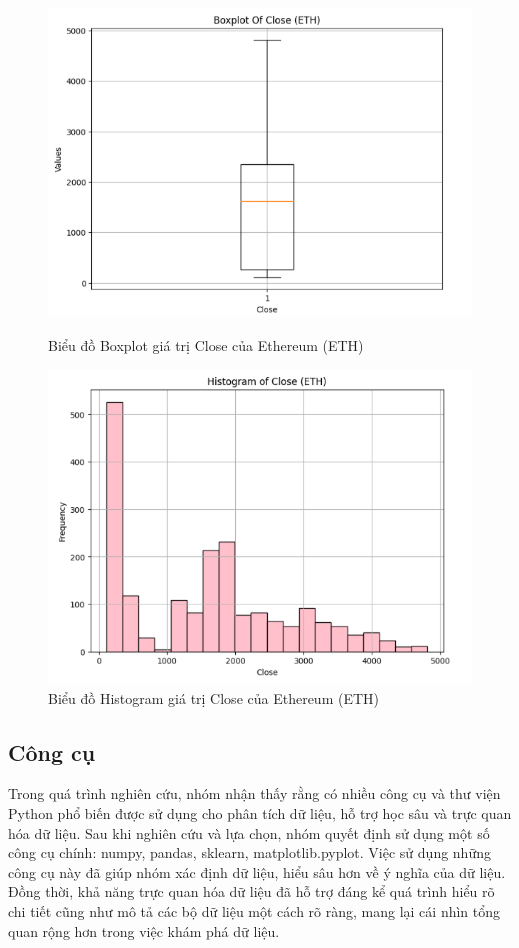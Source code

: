 \documentclass[conference]{IEEEtran}
\begin{document}
	\begin{figure}[H]
		\centering
		\begin{minipage}{0.23\textwidth}
			\centering
			\includegraphics[width=1\textwidth]{Figure/ETHBoxplot.png}
			\caption{Biểu đồ Boxplot giá trị Close của Ethereum (ETH)}
			\label{fig:1}
		\end{minipage}
		\hfill
		\begin{minipage}{0.23\textwidth}
			\centering
			\includegraphics[width=1\textwidth]{Figure/ETHHistogram.png}
			\caption{Biểu đồ Histogram giá trị Close của Ethereum (ETH)}
			\label{fig:2}
		\end{minipage}
	\end{figure}
	
	\subsection{Công cụ}
	Trong quá trình nghiên cứu, nhóm nhận thấy rằng có nhiều công cụ và thư viện Python phổ biến được sử dụng cho phân tích dữ liệu, hỗ trợ học sâu và trực quan hóa dữ liệu. Sau khi nghiên cứu và lựa chọn, nhóm quyết định sử dụng một số công cụ chính: numpy, pandas, sklearn, matplotlib.pyplot. Việc sử dụng những công cụ này đã giúp nhóm xác định dữ liệu, hiểu sâu hơn về ý nghĩa của dữ liệu. Đồng thời, khả năng trực quan hóa dữ liệu đã hỗ trợ đáng kể quá trình hiểu rõ chi tiết cũng như mô tả các bộ dữ liệu một cách rõ ràng, mang lại cái nhìn tổng quan rộng hơn trong việc khám phá dữ liệu.
	
\end{document}
